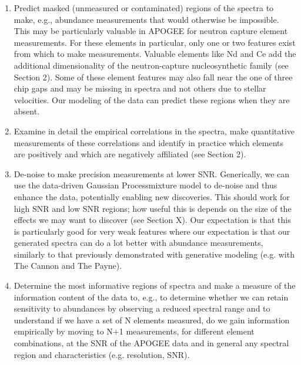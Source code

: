 \documentclass[a4paper,fleqn,usenatbib]{mnras}
\begin{document}
\begin{enumerate}
\item Predict masked (unmeasured or contaminated) regions of the spectra to make, e.g., abundance measurements that would otherwise be impossible. This may be particularly valuable in APOGEE for neutron capture element measurements. For these elements in particular,  only one or two features exist from which to make measurements. Valuable elements like Nd and Ce add the additional dimensionality of the neutron-capture nucleosynthetic family (see Section 2). Some of these element features may also fall near the one of three chip gaps and may be missing in spectra and not others due to stellar velocities. Our modeling of the data can predict these regions when they are absent. 
\item Examine in detail the empirical correlations in the spectra, make quantitative measurements of these correlations and identify in practice which elements are positively and which are negatively affiliated (see Section 2). %
\item De-noise to make precision measurements at lower SNR.  Generically, we can use the data-driven Gaussian Processmixture model to de-noise and thus enhance the data, potentially enabling new discoveries. This should work for high SNR and low SNR regions; how useful this is depends on the size of the effects we may want to discover (see Section X). Our expectation is that this is particularly good for very weak features where our expectation is that our generated spectra can do a lot better with abundance measurements, similarly to that previously demonstrated with generative modeling (e.g. with The Cannon and The Payne).
\item Determine the most informative regions of spectra and make a measure of the information content of the data to, e.g., to determine whether we can retain sensitivity to abundances by observing a reduced spectral range and to understand if we have a set of N elements measured, do we gain information empirically by moving to N+1 measurements, for different element combinations, at the SNR of the APOGEE data and in general any spectral region and characteristics (e.g. resolution, SNR). 
\end{enumerate}
\end{document}
